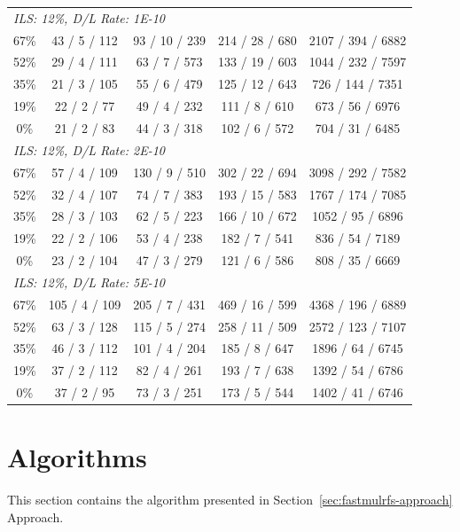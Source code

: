 \begin{table}[!h]
\begin{tabular}{ccccc}
\multicolumn{5}{l}{\em ILS: 12\%, D/L Rate: 1E-10}\\[0.5ex]
67\% & 43 / 5 / 112 & 93 / 10 / 239 & 214 / 28 / 680 & 2107 / 394 / 6882\\
52\% & 29 / 4 / 111 & 63 / 7 / 573 & 133 / 19 / 603 & 1044 / 232 / 7597\\
35\% & 21 / 3 / 105 & 55 / 6 / 479 & 125 / 12 / 643 & 726 / 144 / 7351\\
19\% & 22 / 2 / 77 & 49 / 4 / 232 & 111 / 8 / 610 & 673 / 56 / 6976\\
0\% & 21 / 2 / 83 & 44 / 3 / 318 & 102 / 6 / 572 & 704 / 31 / 6485\\[2ex]
\multicolumn{5}{l}{\em ILS: 12\%, D/L Rate: 2E-10}\\[0.5ex]
67\% & 57 / 4 / 109 & 130 / 9 / 510 & 302 / 22 / 694 & 3098 / 292 / 7582\\
52\% & 32 / 4 / 107 & 74 / 7 / 383 & 193 / 15 / 583 & 1767 / 174 / 7085\\
35\% & 28 / 3 / 103 & 62 / 5 / 223 & 166 / 10 / 672 & 1052 / 95 / 6896\\
19\% & 22 / 2 / 106 & 53 / 4 / 238 & 182 / 7 / 541 & 836 / 54 / 7189\\
0\% & 23 / 2 / 104 & 47 / 3 / 279 & 121 / 6 / 586 & 808 / 35 / 6669\\[2ex]
\multicolumn{5}{l}{\em ILS: 12\%, D/L Rate: 5E-10}\\[0.5ex]
67\% & 105 / 4 / 109 & 205 / 7 / 431 & 469 / 16 / 599 & 4368 / 196 / 6889\\
52\% & 63 / 3 / 128 & 115 / 5 / 274 & 258 / 11 / 509 & 2572 / 123 / 7107\\
35\% & 46 / 3 / 112 & 101 / 4 / 204 & 185 / 8 / 647 & 1896 / 64 / 6745\\
19\% & 37 / 2 / 112 & 82 / 4 / 261 & 193 / 7 / 638 & 1392 / 54 / 6786\\
0\% & 37 / 2 / 95 & 73 / 3 / 251 & 173 / 5 / 544 & 1402 / 41 / 6746\\
\bottomrule
\end{tabular}
\end{table}

\clearpage

\section{Algorithms}
\label{sec:fastmulrfs-algorithms}
This section contains the algorithm presented in Section~\ref{sec:fastmulrfs-approach} Approach.

\vspace{12pt}

